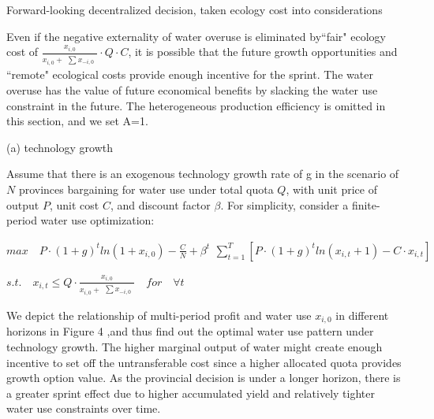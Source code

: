     \begin{case_appendix}Forward-looking decentralized decision, taken ecology cost into considerations

    Even if the negative externality of water overuse is eliminated by``fair" ecology cost of $\frac{x_{i,0}}{x_{i,0} + \begin{matrix} \sum x_{-i,0} \end{matrix}} \cdot Q \cdot C$, it is possible that the future growth opportunities and ``remote" ecological costs provide enough incentive for the sprint.  The water overuse has the value of future economical benefits by slacking the water use constraint in the future. The heterogeneous production efficiency is omitted in this section, and we set A=1.

(a) technology growth

Assume that there is an exogenous technology growth rate of g in the scenario of $N$ provinces bargaining for water use under total quota $Q$, with unit price of output $P$, unit cost $C$, and discount factor $\beta$. For simplicity, consider a finite-period water use optimization:

$ max \quad P \cdot (1+g)^t ln(1+x_{i,0})-\frac{C}{N}+\beta^t \begin{matrix} \sum_{t=1}^T [P \cdot (1+g)^t ln(x_{i,t}+1)-C \cdot x_{i,t}] \end{matrix}$

$s.t. \quad x_{i,t} \leq Q \cdot \frac{x_{i,0}}{x_{i,0} + \begin{matrix} \sum x_{-i,0} \end{matrix}} \quad for \quad \forall t$

We depict the relationship of multi-period profit and water use $x_{i,0}$ in different horizons in Figure 4%
,and thus find out the optimal water use pattern under technology growth. The higher marginal output of water might create enough incentive to set off the untransferable cost since a higher allocated quota provides growth option value. As the provincial decision is under a longer horizon, there is a greater sprint effect due to higher accumulated yield and relatively tighter water use constraints over time.




\end{case_appendix}
